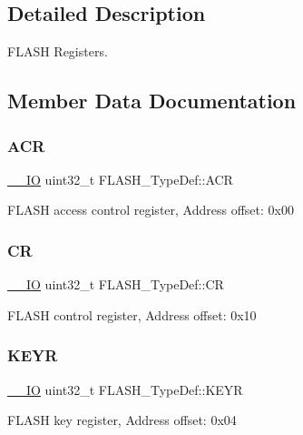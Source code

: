 \subsection{Detailed Description}
F\+L\+A\+SH Registers. 

\subsection{Member Data Documentation}
\mbox{\label{struct_f_l_a_s_h___type_def_aaf432a8a8948613f4f66fcace5d2e5fe}} 
\subsubsection{\texorpdfstring{ACR}{ACR}}
{\footnotesize\ttfamily \mbox{\hyperlink{core__sc300_8h_aec43007d9998a0a0e01faede4133d6be}{\+\_\+\+\_\+\+IO}} uint32\+\_\+t F\+L\+A\+S\+H\+\_\+\+Type\+Def\+::\+A\+CR}

F\+L\+A\+SH access control register, Address offset\+: 0x00 \mbox{\label{struct_f_l_a_s_h___type_def_a7919306d0e032a855200420a57f884d7}} 
\subsubsection{\texorpdfstring{CR}{CR}}
{\footnotesize\ttfamily \mbox{\hyperlink{core__sc300_8h_aec43007d9998a0a0e01faede4133d6be}{\+\_\+\+\_\+\+IO}} uint32\+\_\+t F\+L\+A\+S\+H\+\_\+\+Type\+Def\+::\+CR}

F\+L\+A\+SH control register, Address offset\+: 0x10 \mbox{\label{struct_f_l_a_s_h___type_def_a802e9a26a89b44decd2d32d97f729dd3}} 
\subsubsection{\texorpdfstring{KEYR}{KEYR}}
{\footnotesize\ttfamily \mbox{\hyperlink{core__sc300_8h_aec43007d9998a0a0e01faede4133d6be}{\+\_\+\+\_\+\+IO}} uint32\+\_\+t F\+L\+A\+S\+H\+\_\+\+Type\+Def\+::\+K\+E\+YR}

F\+L\+A\+SH key register, Address offset\+: 0x04 \mbox{\label{struct_f_l_a_s_h___type_def_a54026c3b5bc2059f1b187acb6c4817ac}} 
